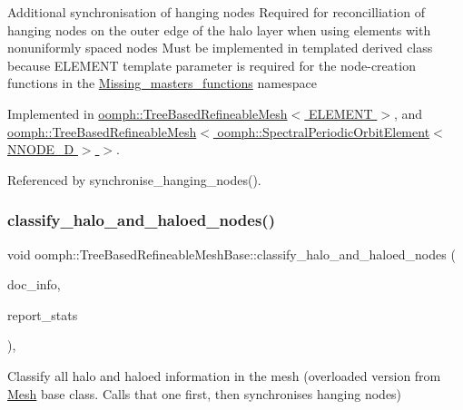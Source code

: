 Additional synchronisation of hanging nodes Required for reconcilliation of hanging nodes on the outer edge of the halo layer when using elements with nonuniformly spaced nodes Must be implemented in templated derived class because E\+L\+E\+M\+E\+NT template parameter is required for the node-\/creation functions in the \hyperlink{namespaceoomph_1_1Missing__masters__functions}{Missing\+\_\+masters\+\_\+functions} namespace 

Implemented in \hyperlink{classoomph_1_1TreeBasedRefineableMesh_a1af8d6a53048bd0d376f6a56bbd4c125}{oomph\+::\+Tree\+Based\+Refineable\+Mesh$<$ E\+L\+E\+M\+E\+N\+T $>$}, and \hyperlink{classoomph_1_1TreeBasedRefineableMesh_a1af8d6a53048bd0d376f6a56bbd4c125}{oomph\+::\+Tree\+Based\+Refineable\+Mesh$<$ oomph\+::\+Spectral\+Periodic\+Orbit\+Element$<$ N\+N\+O\+D\+E\+\_\+D $>$ $>$}.



Referenced by synchronise\+\_\+hanging\+\_\+nodes().

\mbox{\label{classoomph_1_1TreeBasedRefineableMeshBase_aec7c6fc41272ec883c589ee56d1b01e6}} 
\subsubsection{\texorpdfstring{classify\+\_\+halo\+\_\+and\+\_\+haloed\+\_\+nodes()}{classify\_halo\_and\_haloed\_nodes()}\hspace{0.1cm}{\footnotesize\ttfamily [1/2]}}
{\footnotesize\ttfamily void oomph\+::\+Tree\+Based\+Refineable\+Mesh\+Base\+::classify\+\_\+halo\+\_\+and\+\_\+haloed\+\_\+nodes (\begin{DoxyParamCaption}\item[{\hyperlink{classoomph_1_1DocInfo}{Doc\+Info} \&}]{doc\+\_\+info,  }\item[{const bool \&}]{report\+\_\+stats }\end{DoxyParamCaption})\hspace{0.3cm}{\ttfamily [inline]}, {\ttfamily [virtual]}}

Classify all halo and haloed information in the mesh (overloaded version from \hyperlink{classoomph_1_1Mesh}{Mesh} base class. Calls that one first, then synchronises hanging nodes) 

